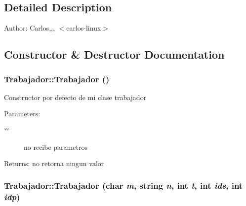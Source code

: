 \subsection{Detailed Description}
\begin{Desc}
\item[Author:]Carlos,,, $<$carlos-linux$>$ \end{Desc}


\subsection{Constructor \& Destructor Documentation}
\hypertarget{classTrabajador_3238c3ef60a3e888aa1995399fbee23d}{
\subsubsection[Trabajador]{\setlength{\rightskip}{0pt plus 5cm}Trabajador::Trabajador ()}}
\label{classTrabajador_3238c3ef60a3e888aa1995399fbee23d}


Constructor por defecto de mi clase trabajador \begin{Desc}
\item[Parameters:]
\begin{description}
\item[{\em \char`\"{}\char`\"{}}]no recibe parametros \end{description}
\end{Desc}
\begin{Desc}
\item[Returns:]no retorna ningun valor \end{Desc}
\hypertarget{classTrabajador_0596d6d4ac1eaab49ccabb42dfd2fc68}{
\subsubsection[Trabajador]{\setlength{\rightskip}{0pt plus 5cm}Trabajador::Trabajador (char {\em m}, \/  string {\em n}, \/  int {\em t}, \/  int {\em ids}, \/  int {\em idp})}}
\label{classTrabajador_0596d6d4ac1eaab49ccabb42dfd2fc68}


